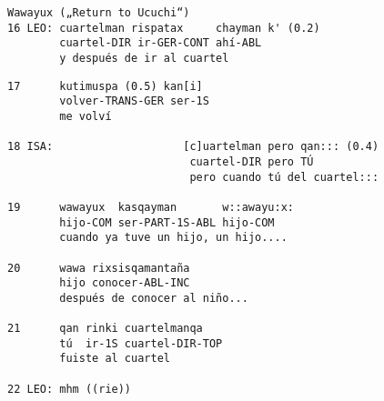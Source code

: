 \documentclass[output=paper]{../langscibook}
\begin{document}
\ea\label{ex:satti:11}
\begin{verbatim}
Wawayux („Return to Ucuchi“)
16 LEO: cuartelman rispatax     chayman k' (0.2)
        cuartel-DIR ir-GER-CONT ahí-ABL
        y después de ir al cuartel

\end{verbatim}
\newpage
\begin{verbatim}
17      kutimuspa (0.5) kan[i]
        volver-TRANS-GER ser-1S
        me volví

18 ISA:                    [c]uartelman pero qan::: (0.4)
                            cuartel-DIR pero TÚ
                            pero cuando tú del cuartel:::

19      wawayux  kasqayman       w::awayu:x:
        hijo-COM ser-PART-1S-ABL hijo-COM
        cuando ya tuve un hijo, un hijo....

20      wawa rixsisqamantaña
        hijo conocer-ABL-INC
        después de conocer al niño...

21      qan rinki cuartelmanqa
        tú  ir-1S cuartel-DIR-TOP
        fuiste al cuartel

22 LEO: mhm ((rie))
\end{verbatim}
\z
\end{document}
